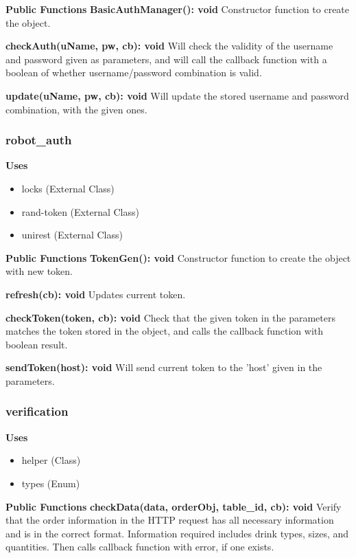 \documentclass [10pt]{article}
\begin{document}
\textbf{Public Functions}
\textbf{BasicAuthManager(): void}
Constructor function to create the object.

\textbf{checkAuth(uName, pw, cb): void}
Will check the validity of the username and password given as parameters, and will call the callback function with a boolean of whether username/password combination is valid.

\textbf{update(uName, pw, cb): void}
Will update the stored username and password combination, with the given ones.


\subsubsection{robot\_auth}
\textbf{Uses}
\begin{itemize}
	\item locks (External Class)
	\item rand-token (External Class)
	\item unirest (External Class)
\end{itemize}

\textbf{Public Functions}
\textbf{TokenGen(): void}
Constructor function to create the object with new token.

\textbf{refresh(cb): void}
Updates current token.

\textbf{checkToken(token, cb): void}
Check that the given token in the parameters matches the token stored in the object, and calls the callback function with boolean result.

\textbf{sendToken(host): void}
Will send current token to the 'host' given in the parameters.


\subsubsection{verification}
\textbf{Uses}
\begin{itemize}
	\item helper (Class)
	\item types (Enum)
\end{itemize}

\textbf{Public Functions}
\textbf{checkData(data, orderObj, table\_id, cb): void}
Verify that the order information in the HTTP request has all necessary information and is in the correct format. Information required includes drink types, sizes, and quantities. Then calls callback function with error, if one exists.
\end{document}
